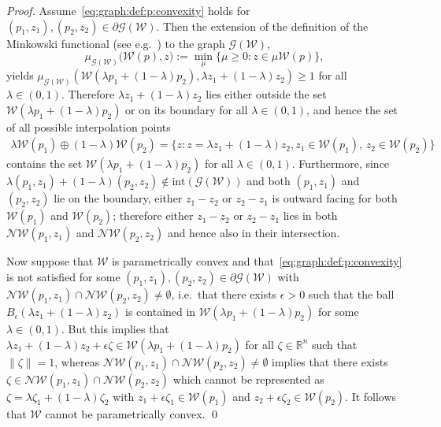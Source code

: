 \documentclass[smallextended]{svjour3}       %
\numberwithin{equation}{section}
\begin{document}
%
\begin{proof}
%
Assume~\eqref{eq:graph:def:p:convexity} holds for $(p_1,z_1),(p_2,z_2)\in\partial\mathscr G(\mathcal W)$.
%
Then the extension of the definition of the Minkowski functional (see e.g.~\cite{Rudin:91}) to the graph $\mathscr G(\mathcal W)$,
\[
\mu_{\mathscr G(\mathcal W)} \bigl(
\mathcal W(p), z \bigr)
:= \min_\mu \{\mu \geq 0 : z \in \mu \mathcal W(p)\},
\]
yields $\mu_{\mathscr G(\mathcal W)}\left(\mathcal W(\lambda p_1 + (1-\lambda)p_2),\lambda z_1+(1-\lambda)z_2\right)\geq1$ for all $\lambda\in(0,1)$. Therefore $\lambda z_1 + (1-\lambda) z_2$
lies either outside the set $\mathcal W(\lambda p_1+(1-\lambda)p_2)$ or on its boundary for all $\lambda\in(0,1)$, and hence the set of all possible interpolation points 
%
\[
\begin{split}
  \lambda \mathcal W(p_1)\oplus (1-\lambda)\mathcal W(p_2) = \{z : z=\lambda z_1 + (1-\lambda) z_2, z_1\in\mathcal  W(p_1),\, z_2\in\mathcal W(p_2)\}
\end{split}
\]
%
contains the set $\mathcal W(\lambda p_1 + (1-\lambda)p_2)$ for all $\lambda\in(0,1)$.
%
Furthermore, since $\lambda(p_1,z_1)+(1-\lambda)(p_2,z_2)\not\in \text{int}(\mathscr G(\mathcal W))$ and both $(p_1,z_1)$ and $(p_2,z_2)$ lie on the boundary, either $z_1-z_2$ or $z_2-z_1$ is outward facing for both $\mathcal W(p_1)$ and $\mathcal W(p_2)$; therefore either $z_1-z_2$ or $z_2-z_1$ lies in both $\mathcal N\mathcal W(p_1,z_1)$ and $\mathcal N\mathcal W(p_2,z_2)$ and hence also in their intersection.

Now suppose that $\mathcal W$ is parametrically convex and that~\eqref{eq:graph:def:p:convexity} is not satisfied for 
some $(p_1,z_1),(p_2,z_2)\in\partial\mathscr G(\mathcal W)$ with $\mathcal N\mathcal W(p_1,z_1)\cap\mathcal 
N\mathcal W(p_2,z_2)\neq\emptyset$, 
%
i.e.~that there exists $\epsilon>0$ such that the ball
$B_\epsilon(\lambda z_1 + (1-\lambda)z_2 )$
is contained in $\mathcal W(\lambda p_1 + (1-\lambda)p_2)$ for some $\lambda \in (0,1)$.
%
But this implies that $\lambda z_1 + (1-\lambda) z_2 + \epsilon\zeta \in \mathcal W(\lambda p_1+(1-\lambda)p_2)$  for all $\zeta\in\mathbb R^n$ such that $\|\zeta\| = 1$, whereas
$\mathcal N\mathcal W(p_1,z_1)\cap\mathcal N\mathcal W(p_2,z_2)\neq\emptyset$ implies that there exists 
$\zeta \in\mathcal N\mathcal W(p_1,z_1)\cap\mathcal N\mathcal W(p_2,z_2)$ which cannot be represented as
$\zeta =\lambda \zeta_1+
(1-\lambda)\zeta_2$
with $z_1 + \epsilon \zeta_1\in\mathcal W(p_1)$ and $z_2  + \epsilon \zeta_2\in\mathcal W(p_2)$.
%
It follows that $\mathcal W$ cannot be parametrically convex.
\qed
\end{proof}
%
\end{document}
